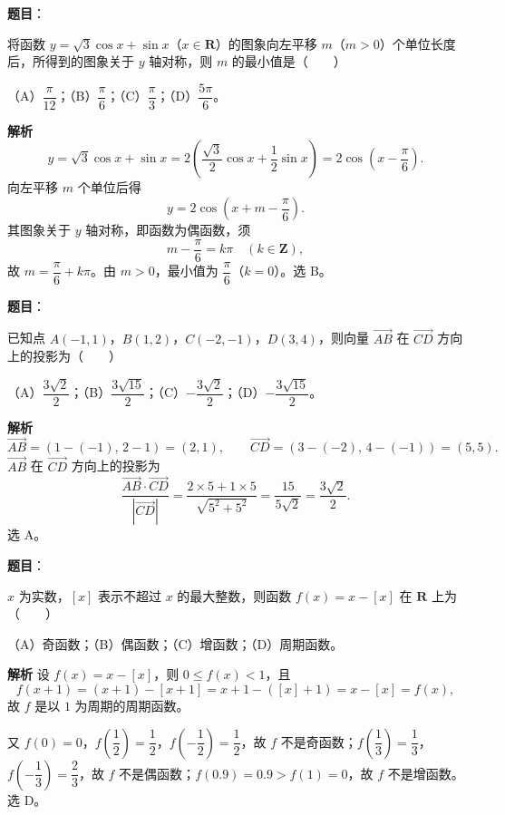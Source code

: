 \begin{answer}

\textbf{题目}：

将函数 $y=\sqrt3\cos x+\sin x$（$x\in\mathbf R$）的图象向左平移 $m$（$m>0$）个单位长度后，所得到的图象关于 $y$ 轴对称，则 $m$ 的最小值是\mbox{（　　）}

（A）$\dfrac\pi{12}$；（B）$\dfrac\pi6$；（C）$\dfrac\pi3$；（D）$\dfrac{5\pi}6$。

\textbf{解析}
\nopagebreak[4]
\[y=\sqrt3\cos x+\sin x=2\left(\frac{\sqrt3}2\cos x+\frac12\sin x\right)=2\cos\left(x-\frac\pi6\right).\]
向左平移 $m$ 个单位后得
\nopagebreak[4]
\[y=2\cos\left(x+m-\frac\pi6\right).\]
其图象关于 $y$ 轴对称，即函数为偶函数，须
\nopagebreak[4]
\[m-\frac\pi6=k\pi\quad(k\in\mathbf Z),\]
故 $m=\dfrac\pi6+k\pi$。由 $m>0$，最小值为 $\dfrac\pi6$（$k=0$）。选 B。


\end{answer}
\begin{answer}

\textbf{题目}：

已知点 $A(-1,1)$，$B(1,2)$，$C(-2,-1)$，$D(3,4)$，则向量 $\overrightarrow{AB}$ 在 $\overrightarrow{CD}$ 方向上的投影为\mbox{（　　）}

（A）$\dfrac{3\sqrt2}2$；（B）$\dfrac{3\sqrt{15}}2$；（C）$-\dfrac{3\sqrt2}2$；（D）$-\dfrac{3\sqrt{15}}2$。

\textbf{解析}
\nopagebreak[4]
\[\overrightarrow{AB}=(1-(-1),\,2-1)=(2,1),\qquad
\overrightarrow{CD}=(3-(-2),\,4-(-1))=(5,5).\]
$\overrightarrow{AB}$ 在 $\overrightarrow{CD}$ 方向上的投影为
\nopagebreak[4]
\[\frac{\overrightarrow{AB}\cdot\overrightarrow{CD}}{|\overrightarrow{CD}|}
=\frac{2\times5+1\times5}{\sqrt{5^2+5^2}}
=\frac{15}{5\sqrt2}=\frac{3\sqrt2}2.\]
选 A。


\end{answer}
\begin{answer}

\textbf{题目}：

$x$ 为实数，$[x]$ 表示不超过 $x$ 的最大整数，则函数 $f(x)=x-[x]$ 在 $\mathbf R$ 上为\mbox{（　　）}

（A）奇函数；（B）偶函数；（C）增函数；（D）周期函数。

\textbf{解析}
设 $f(x)=x-[x]$，则 $0\leqslant f(x)<1$，且
\nopagebreak[4]
\[f(x+1)=(x+1)-[x+1]=x+1-([x]+1)=x-[x]=f(x),\]
故 $f$ 是以 $1$ 为周期的周期函数。

又 $f(0)=0$，$f\!\left(\dfrac12\right)=\dfrac12$，$f\!\left(-\dfrac12\right)=\dfrac12$，故 $f$ 不是奇函数；$f\!\left(\dfrac13\right)=\dfrac13$，$f\!\left(-\dfrac13\right)=\dfrac23$，故 $f$ 不是偶函数；$f(0.9)=0.9>f(1)=0$，故 $f$ 不是增函数。选 D。


\end{answer}
